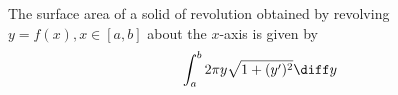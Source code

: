 \begin{frame}

\begin{definition}
The surface area of a solid of revolution obtained by revolving $y=f(x), x\in[a,b]$ about the $x$-axis is given by
\[
\int_{a}^{b}2\pi y\sqrt{1+(y')^2}\diff y
\]

\end{definition}



\end{frame}